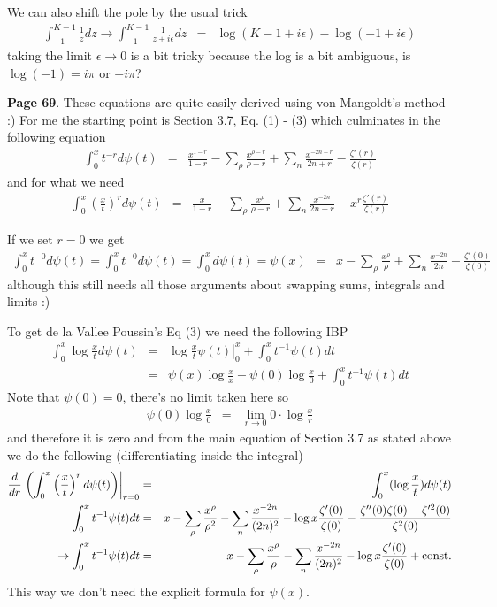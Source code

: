 \documentclass[aps,preprint,preprintnumbers,nofootinbib,showpacs,prd]{revtex4-1}
\newcommand{\nbea}{\begin{eqnarray*}}
\newcommand{\neea}{\end{eqnarray*}}
\begin{document}
We can also shift the pole by the usual trick
%
\nbea
\int_{-1}^{K-1} \frac{1}{z} dz \to \int_{-1}^{K-1} \frac{1}{z + i\epsilon} dz & = & \log (K - 1 + i\epsilon) - \log(-1 + i\epsilon)
\neea
%
taking the limit $\epsilon\to0$ is a bit tricky because the log is a bit ambiguous, is $\log (-1) = i \pi$ or $-i\pi$?

{\bf Page 69}. These equations are quite easily derived using von Mangoldt's method :) For me the starting point is Section 3.7, Eq. (1) - (3) which culminates in the following equation 
%
\nbea
\int_0^x t^{-r} d\psi(t) & = & \frac{x^{1-r}}{1-r} - \sum_\rho \frac{x^{\rho-r}}{\rho-r} + \sum_n \frac{x^{-2n-r}}{2n+r} - \frac{\zeta'(r)}{\zeta(r)}
\neea
%
and for what we need
%
\nbea
\int_0^x \left(\frac{x}{t}\right)^{r} d\psi(t) & = & \frac{x}{1-r} - \sum_\rho \frac{x^{\rho}}{\rho-r} + \sum_n \frac{x^{-2n}}{2n+r} - x^r\frac{\zeta'(r)}{\zeta(r)}
\neea
%


If we set $r=0$ we get
%
\nbea
\int_0^x t^{-0} d\psi(t) = \int_0^x t^{-0} d\psi(t) = \int_0^x d\psi(t) = \psi(x) & = & x - \sum_\rho \frac{x^{\rho}}{\rho} + \sum_n \frac{x^{-2n}}{2n} - \frac{\zeta'(0)}{\zeta(0)}
\neea
%
although this still needs all those arguments about swapping sums, integrals and limits :)

To get de la Vallee Poussin's Eq (3) we need the following IBP 
%
\nbea
\int_0^x \log \frac{x}{t} d\psi(t) & = & \left. \log \frac{x}{t} \psi(t) \right|_0^x + \int_0^x t^{-1} \psi(t) dt \\
& = & \psi(x) \log \frac{x}{x} - \psi(0)\log \frac{x}{0} + \int_0^x t^{-1} \psi(t) dt
\neea
%
Note that $\psi(0) = 0$, there's no limit taken here so
%
\nbea
\psi(0)\log \frac{x}{0} & = & \lim_{r\to0} 0 \cdot \log \frac{x}{r}
\neea
%
and therefore it is zero and from the main equation of Section 3.7 as stated above we do the following (differentiating inside the integral)
%
\nbea
\frac{d}{dr}\left.\left(\int_0^x \left(\frac{x}{t}\right)^{r} d\psi(t)\right)\right|_{r = 0} & = & \int_0^x (\log \frac{x}{t}) d\psi(t)\\
\int_0^{x} t^{-1} \psi(t) dt & = & x - \sum_\rho \frac{x^\rho}{\rho^2} - \sum_n \frac{x^{-2n}}{(2n)^2} - \log x \frac{\zeta'(0)}{\zeta(0)}  - \frac{\zeta''(0)\zeta(0) - \zeta'^2(0)}{\zeta^2(0)} \\
\to \int_0^{x} t^{-1} \psi(t) dt & = & x -\sum_\rho \frac{x^\rho}{\rho} - \sum_n \frac{x^{-2n}}{(2n)^2} - \log x\frac{\zeta'(0)}{\zeta(0)} + {\rm const.}
\neea
%
This way we don't need the explicit formula for $\psi(x)$.
\end{document}
